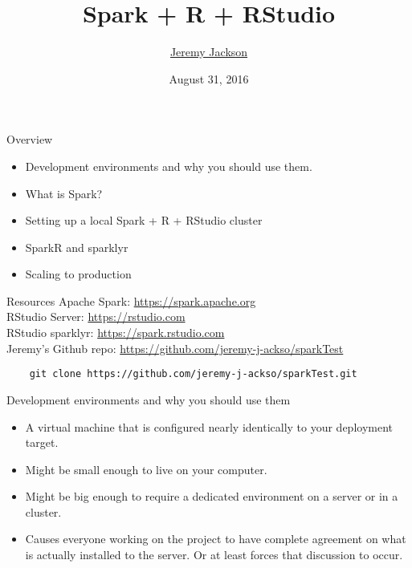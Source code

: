 \documentclass[pdf]{beamer}
\title{Spark + R + RStudio}
\author{\href{mailto:jeremy_j@ackso.net}{Jeremy Jackson}}
\date{August 31, 2016}
\begin{document}
\begin{frame}
	\titlepage
\end{frame}


\begin{frame}{Overview}
    \begin{itemize}
	\item Development environments and why you should use them.
	\item What is Spark?
	\item Setting up a local Spark + R + RStudio cluster
	\item SparkR and sparklyr 
	\item Scaling to production
    \end{itemize}
\end{frame}

\begin{frame}[fragile]{Resources}
    Apache Spark: \url{https://spark.apache.org}\\
    RStudio Server: \url{https://rstudio.com}\\
    RStudio sparklyr: \url{https://spark.rstudio.com}\\
    Jeremy's Github repo: \url{https://github.com/jeremy-j-ackso/sparkTest}\\

    \begin{verbatim}
	git clone https://github.com/jeremy-j-ackso/sparkTest.git
    \end{verbatim}
\end{frame}

\begin{frame}{Development environments and why you should use them}
    \begin{itemize}
	\item A virtual machine that is configured nearly identically to your deployment target.
	\item Might be small enough to live on your computer.
	\item Might be big enough to require a dedicated environment on a server or in a cluster.
	\item Causes everyone working on the project to have complete agreement on what is actually installed to the server. Or at least forces that discussion to occur.
    \end{itemize}
\end{frame}
\end{document}
